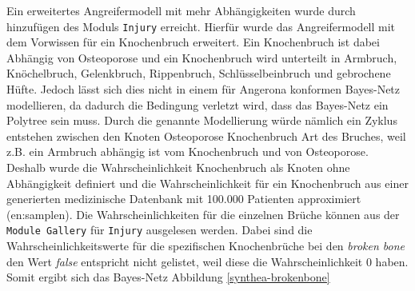 \documentclass[german,version-2020-11]{uzl-thesis}
\begin{document}
Ein erweitertes Angreifermodell mit mehr Abhängigkeiten wurde durch hinzufügen des Moduls \texttt{Injury} erreicht. Hierfür wurde das Angreifermodell mit dem Vorwissen für ein Knochenbruch erweitert. Ein Knochenbruch ist dabei Abhängig von Osteoporose und ein Knochenbruch wird unterteilt in Armbruch, Knöchelbruch, Gelenkbruch, Rippenbruch, Schlüsselbeinbruch und gebrochene Hüfte. Jedoch lässt sich dies nicht in einem für Angerona konformen Bayes-Netz modellieren, da dadurch die Bedingung verletzt wird, dass das Bayes-Netz ein Polytree sein muss. Durch die genannte Modellierung würde nämlich ein Zyklus entstehen zwischen den Knoten Osteoporose \leftrightarrow Knochenbruch \leftrightarrow Art des Bruches, weil z.B. ein Armbruch abhängig ist vom Knochenbruch und von Osteoporose. \\ 
Deshalb wurde die Wahrscheinlichkeit Knochenbruch als Knoten ohne Abhängigkeit definiert und die Wahrscheinlichkeit für ein Knochenbruch aus einer generierten medizinische Datenbank mit 100.000 Patienten approximiert (en:samplen). Die Wahrscheinlichkeiten für die einzelnen Brüche können aus der \texttt{Module Gallery} für \texttt{Injury} ausgelesen werden. Dabei sind die Wahrscheinlichkeitswerte für die spezifischen Knochenbrüche bei den \textit{broken bone} den Wert \textit{false} entspricht nicht gelistet, weil diese die Wahrscheinlichkeit 0 haben. Somit ergibt sich das Bayes-Netz Abbildung \ref{synthea-brokenbone}
\end{document}
